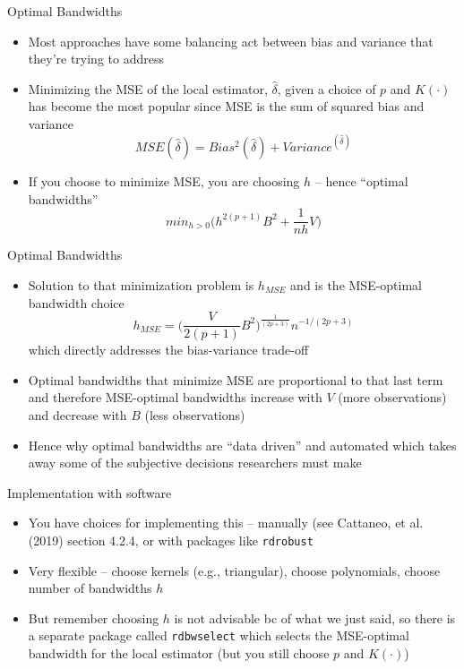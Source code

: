 \documentclass{beamer}
\begin{document}
\begin{frame}{Optimal Bandwidths}

\begin{itemize}
\item Most approaches have some balancing act between bias and variance that they're trying to address
\item Minimizing the MSE of the local estimator, $\widehat{\delta}$, given a choice of $p$ and $K(\cdot)$ has become the most popular since MSE is the sum of squared bias and variance $$MSE(\widehat{\delta}) = Bias^2(\widehat{\delta}) + Variance^(\widehat{\delta})$$
\item If you choose to minimize MSE, you are choosing $h$ -- hence ``optimal bandwidths'' $$min_{h>0} \bigg (h^{2(p+1)}B^2+\frac{1}{nh}V \bigg )$$
\end{itemize}

\end{frame}

\begin{frame}{Optimal Bandwidths}

\begin{itemize}
\item Solution to that minimization problem is $h_{MSE}$ and is the MSE-optimal bandwidth choice$$h_{MSE} = \bigg ( \frac{V}{2(p+1)}B^2 \bigg )^{\frac{1}{(2p+3)}}n^{-1/(2p+3)}$$which directly addresses the bias-variance trade-off
\item Optimal bandwidths that minimize MSE are proportional to that last term and therefore MSE-optimal bandwidths increase with $V$ (more observations) and decrease with $B$ (less observations)
\item Hence why optimal bandwidths are ``data driven'' and automated which takes away some of the subjective decisions researchers must make
\end{itemize}

\end{frame}


\begin{frame}{Implementation with software}

\begin{itemize}
\item You have choices for implementing this -- manually (see Cattaneo, et al. (2019) section 4.2.4, or with packages like \texttt{rdrobust} 
\item Very flexible -- choose kernels (e.g., triangular), choose polynomials, choose number of bandwidths $h$
\item But remember choosing $h$ is not advisable bc of what we just said, so there is a separate package called \texttt{rdbwselect} which selects the MSE-optimal bandwidth for the local estimator (but you still choose $p$ and $K(\cdot)$)
\end{itemize}

\end{frame}
\end{document}
